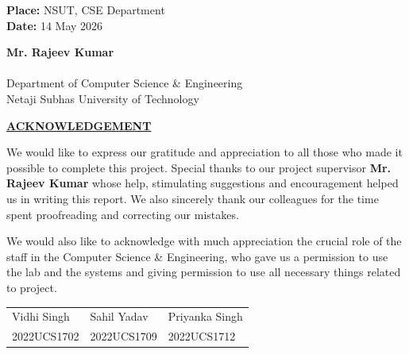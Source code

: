 \documentclass[12pt,a4paper]{report}
\begin{document}
\vspace{1cm}
\noindent \textbf{Place:} NSUT, CSE Department \\
\noindent \textbf{Date:} 14 May 2026

\vspace{2cm}
\begin{flushleft}
    \textbf{Mr. Rajeev Kumar} \\ \\
    Department of Computer Science \& Engineering \\
    Netaji Subhas University of Technology
\end{flushleft}

\newpage
\begin{center}
    {\fontsize{14pt}{16pt}\selectfont \textbf{\underline{ACKNOWLEDGEMENT}}}
\end{center}

\vspace{0.8cm}
\noindent We would like to express our gratitude and appreciation to all those who made it possible to complete this project. Special thanks to our project supervisor \textbf{Mr. Rajeev Kumar} whose help, stimulating suggestions and encouragement helped us in writing this report. We also sincerely thank our colleagues for the time spent proofreading and correcting our mistakes.

\vspace{0.5cm}
\noindent We would also like to acknowledge with much appreciation the crucial role of the staff in the Computer Science \& Engineering, who gave us a permission to use the lab and the systems and giving permission to use all necessary things related to project.

\vspace{3cm}
\noindent \begin{tabular}{@{}p{} p{} p{}@{}}
    Vidhi Singh & Sahil Yadav & Priyanka Singh \\
    2022UCS1702 & 2022UCS1709 & 2022UCS1712
\end{tabular}

    
\end{document}
